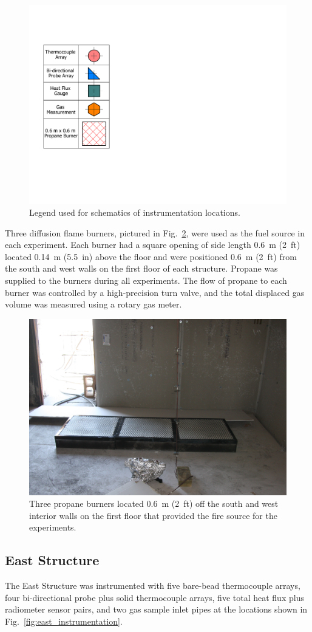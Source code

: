 \documentclass[12pt,oneside]{book}
\begin{document}
\begin{figure}[!ht]
	\includegraphics[width=0.25\columnwidth]{../Figures/Floor_Plans/Instrumentation_Legend}
	\caption[Instrumentation legend.]{Legend used for schematics of instrumentation locations.}
	\label{fig:Instrumentation_Legend}
\end{figure}

Three diffusion flame burners, pictured in Fig.~\ref{fig:burners}, were used as the fuel source in each experiment. Each burner had a square opening of side length 0.6~m (2~ft) located 0.14~m (5.5~in) above the floor and were positioned 0.6~m (2~ft) from the south and west walls on the first floor of each structure. Propane was supplied to the burners during all experiments. The flow of propane to each burner was controlled by a high-precision turn valve, and the total displaced gas volume was measured using a rotary gas meter.

\begin{figure}[!ht]
	\includegraphics[width=0.9\columnwidth]{../Figures/Pictures/burners}
	\caption[Three propane burners used as the fuel source.]{Three propane burners located 0.6~m (2~ft) off the south and west interior walls on the first floor that provided the fire source for the experiments.}
	\label{fig:burners}
\end{figure}

\FloatBarrier

\subsection{East Structure}
The East Structure was instrumented with five bare-bead thermocouple arrays, four bi-directional probe plus solid thermocouple arrays, five total heat flux plus radiometer sensor pairs, and two gas sample inlet pipes at the locations shown in Fig.~\ref{fig:east_instrumentation}.
\end{document}
